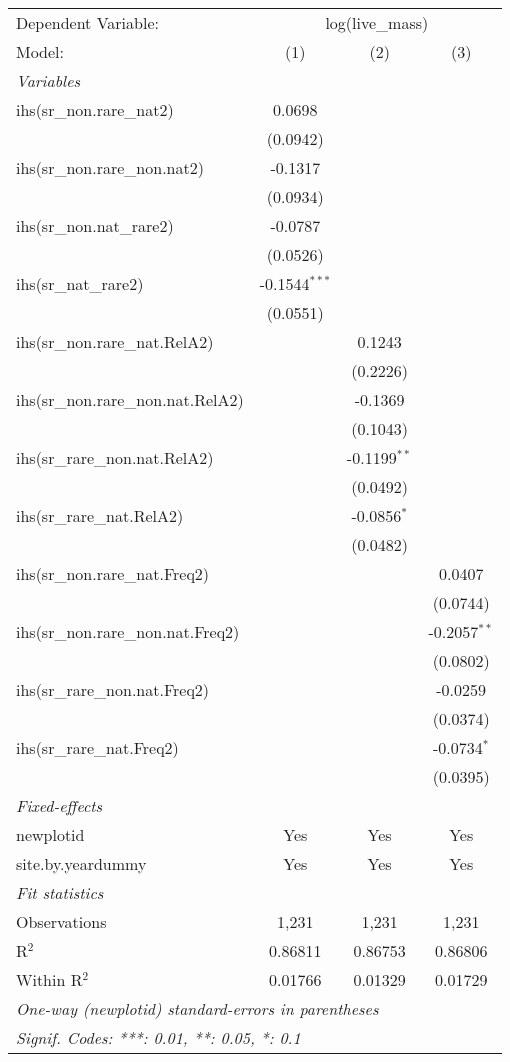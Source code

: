 \begin{tabular}{lccc}
\tabularnewline\midrule\midrule
Dependent Variable:&\multicolumn{3}{c}{log(live\_mass)}\\
Model:&(1) & (2) & (3)\\
\midrule \emph{Variables}&   &   &  \\
ihs(sr\_non.rare\_nat2)&0.0698 &    &   \\
  &(0.0942) &    &   \\
ihs(sr\_non.rare\_non.nat2)&-0.1317 &    &   \\
  &(0.0934) &    &   \\
ihs(sr\_non.nat\_rare2)&-0.0787 &    &   \\
  &(0.0526) &    &   \\
ihs(sr\_nat\_rare2)&-0.1544$^{***}$ &    &   \\
  &(0.0551) &    &   \\
ihs(sr\_non.rare\_nat.RelA2)&   & 0.1243 &   \\
  &   & (0.2226) &   \\
ihs(sr\_non.rare\_non.nat.RelA2)&   & -0.1369 &   \\
  &   & (0.1043) &   \\
ihs(sr\_rare\_non.nat.RelA2)&   & -0.1199$^{**}$ &   \\
  &   & (0.0492) &   \\
ihs(sr\_rare\_nat.RelA2)&   & -0.0856$^{*}$ &   \\
  &   & (0.0482) &   \\
ihs(sr\_non.rare\_nat.Freq2)&   &    & 0.0407\\
  &   &    & (0.0744)\\
ihs(sr\_non.rare\_non.nat.Freq2)&   &    & -0.2057$^{**}$\\
  &   &    & (0.0802)\\
ihs(sr\_rare\_non.nat.Freq2)&   &    & -0.0259\\
  &   &    & (0.0374)\\
ihs(sr\_rare\_nat.Freq2)&   &    & -0.0734$^{*}$\\
  &   &    & (0.0395)\\
\midrule \emph{Fixed-effects}&   &   &  \\
newplotid & Yes & Yes & Yes\\
site.by.yeardummy & Yes & Yes & Yes\\
\midrule \emph{Fit statistics}&  & & \\
Observations & 1,231&1,231&1,231\\
R$^2$ & 0.86811&0.86753&0.86806\\
Within R$^2$ & 0.01766&0.01329&0.01729\\
\midrule\midrule\multicolumn{4}{l}{\emph{One-way (newplotid) standard-errors in parentheses}}\\
\multicolumn{4}{l}{\emph{Signif. Codes: ***: 0.01, **: 0.05, *: 0.1}}\\
\end{tabular}


